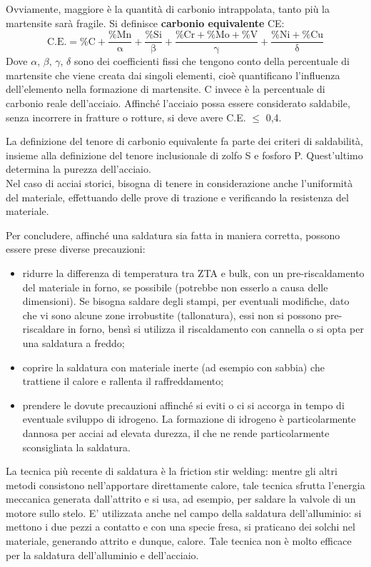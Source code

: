 Ovviamente, maggiore è la quantità di carbonio intrappolata, tanto più la martensite sarà fragile. Si definisce \textbf{carbonio equivalente} CE:
\begin{equation*}
    \mathrm{C.E. = \%C + \frac{\%Mn}{\alpha} + \frac{\%Si}{\beta} +  \frac{\%Cr+\%Mo+\%V}{\gamma} + \frac{\%Ni+\%Cu}{\delta}}
\end{equation*}
Dove $\alpha,\, \beta,\, \gamma,\, \delta$ sono dei coefficienti fissi che tengono conto della percentuale di martensite che viene creata dai singoli elementi, cioè quantificano l’influenza dell’elemento nella formazione di martensite. C invece è la percentuale di carbonio reale dell’acciaio. Affinché l’acciaio possa essere considerato saldabile, senza incorrere in fratture o rotture, si deve avere C.E. $\le$ 0,4.

La definizione del tenore di carbonio equivalente fa parte dei criteri di saldabilità, insieme alla definizione del tenore inclusionale di zolfo S e fosforo P. Quest’ultimo determina la purezza dell’acciaio.\\
Nel caso di acciai storici, bisogna di tenere in considerazione anche l’uniformità del materiale, effettuando delle prove di trazione e verificando la resistenza del materiale.

Per concludere, affinché una saldatura sia fatta in maniera corretta, possono essere prese diverse precauzioni:
\begin{itemize}
    \item ridurre la differenza di temperatura tra ZTA e bulk, con un pre-riscaldamento del materiale in forno, se possibile (potrebbe non esserlo a causa delle dimensioni). Se bisogna saldare degli stampi, per eventuali modifiche, dato che vi sono alcune zone irrobustite (tallonatura), essi non si possono pre-riscaldare in forno, bensì si utilizza il riscaldamento con cannella o si opta per una saldatura a freddo;
\item coprire la saldatura con materiale inerte (ad esempio con sabbia) che trattiene il calore e rallenta il raffreddamento;
\item prendere le dovute precauzioni affinché si eviti o ci si accorga in tempo di eventuale sviluppo di idrogeno. La formazione di idrogeno è particolarmente dannosa per acciai ad elevata durezza, il che ne rende particolarmente sconsigliata la saldatura.
\end{itemize}

La tecnica più recente di saldatura è la friction stir welding: mentre gli altri metodi consistono nell’apportare direttamente calore, tale tecnica sfrutta l’energia meccanica generata dall’attrito e si usa, ad esempio, per saldare la valvole di un motore sullo stelo.
E’ utilizzata anche nel campo della saldatura dell’alluminio: si mettono i due pezzi a contatto e con una specie fresa, si praticano dei solchi nel materiale, generando attrito e dunque, calore. Tale tecnica non è molto efficace per la saldatura dell’alluminio e dell’acciaio.

